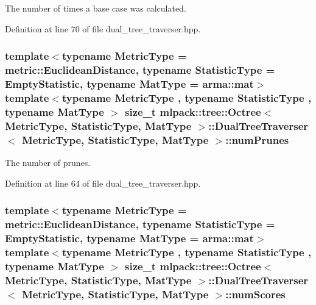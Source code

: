 The number of times a base case was calculated. 



Definition at line 70 of file dual\+\_\+tree\+\_\+traverser.\+hpp.

\subsubsection[{num\+Prunes}]{\setlength{\rightskip}{0pt plus 5cm}template$<$typename Metric\+Type  = metric\+::\+Euclidean\+Distance, typename Statistic\+Type  = Empty\+Statistic, typename Mat\+Type  = arma\+::mat$>$ template$<$typename Metric\+Type , typename Statistic\+Type , typename Mat\+Type $>$ size\+\_\+t {\bf mlpack\+::tree\+::\+Octree}$<$ Metric\+Type, Statistic\+Type, Mat\+Type $>$\+::{\bf Dual\+Tree\+Traverser}$<$ Metric\+Type, Statistic\+Type, Mat\+Type $>$\+::num\+Prunes\hspace{0.3cm}{\ttfamily [private]}}\label{classmlpack_1_1tree_1_1Octree_1_1DualTreeTraverser_a3cae8fa03909c475b397520354c19934}


The number of prunes. 



Definition at line 64 of file dual\+\_\+tree\+\_\+traverser.\+hpp.

\subsubsection[{num\+Scores}]{\setlength{\rightskip}{0pt plus 5cm}template$<$typename Metric\+Type  = metric\+::\+Euclidean\+Distance, typename Statistic\+Type  = Empty\+Statistic, typename Mat\+Type  = arma\+::mat$>$ template$<$typename Metric\+Type , typename Statistic\+Type , typename Mat\+Type $>$ size\+\_\+t {\bf mlpack\+::tree\+::\+Octree}$<$ Metric\+Type, Statistic\+Type, Mat\+Type $>$\+::{\bf Dual\+Tree\+Traverser}$<$ Metric\+Type, Statistic\+Type, Mat\+Type $>$\+::num\+Scores\hspace{0.3cm}{\ttfamily [private]}}\label{classmlpack_1_1tree_1_1Octree_1_1DualTreeTraverser_ae001526b9fe3730ecdd6f17a3abe1e88}


